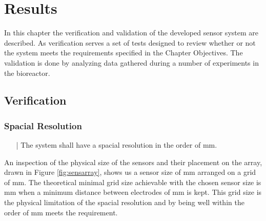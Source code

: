 \chapter{Results}

In this chapter the verification and validation of the developed sensor system are described. As verification serves a set of tests designed to review whether or not the system meets the requirements specified in the Chapter Objectives. The validation is done by analyzing data gathered during a number of experiments in the bioreactor.

\section{Verification}

\subsection{Spacial Resolution}

\begin{itemize}
\item[|] The system shall have a spacial resolution in the order of \unit[10]{mm}.
\end{itemize}

An inspection of the physical size of the sensors and their placement on the array, drawn in Figure \ref{fig:sensarray}, shows us a sensor size of \unit[10x11]{mm} arranged on a grid of \unit[25x50]{mm}. The theoretical minimal grid size achievable with the chosen sensor size is \unit[11x12]{mm} when a minimum distance between electrodes of \unit[1]{mm} is kept.
This grid size is the physical limitation of the spacial resolution and by being well within the order of \unit[10]{mm} meets the requirement.\\

